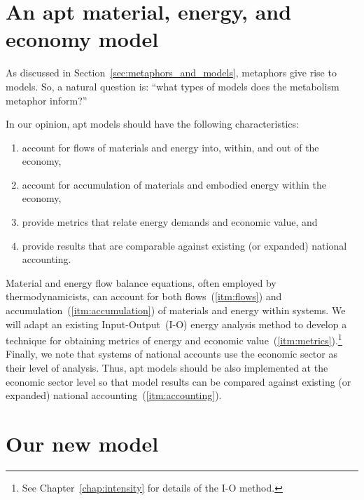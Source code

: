 \section{An apt material, energy, and economy model}
\label{sec:apt_models}

As discussed in Section~\ref{sec:metaphors_and_models}, 
metaphors give rise to models.
So, a natural question is: 
``what types of models does the metabolism metaphor inform?''

In our opinion, apt models should have the following characteristics:

\begin{enumerate}
	\item{\label{itm:flows}account for flows of materials and energy 
			into, within, and out of the economy,}
	\item{\label{itm:accumulation}account for accumulation of materials and embodied energy 
			within the economy,}
	\item{\label{itm:metrics}provide metrics that relate energy demands and economic value, and}
	\item{\label{itm:accounting}provide results that are comparable against existing 
			(or expanded) national accounting.}
\end{enumerate}

Material and energy flow balance equations, 
often employed by thermodynamicists, 
can account for both flows~(\ref{itm:flows}) and accumulation~(\ref{itm:accumulation}) 
of materials and energy within systems.
We will adapt an existing Input-Output~(I-O)
energy analysis method to develop a 
technique for obtaining metrics 
of energy and economic value~(\ref{itm:metrics}).\footnote{See Chapter~\ref{chap:intensity}
for details of the I-O method.}
Finally, we note that systems of national accounts use the economic sector
as their level of analysis. 
Thus, apt models should be also implemented at the economic sector level
so that model results can be 
compared against existing (or expanded) national accounting~(\ref{itm:accounting}).


\section{Our new model}
\label{sec:our_new_model}

%
%
%

